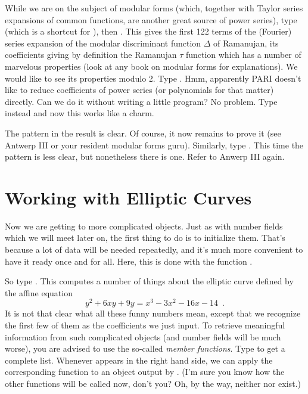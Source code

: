 While we are on the subject of modular forms (which, together with Taylor
series expansions of common functions, are another great source of power
series), type  (which is a shortcut for
), then . This
gives the first 122 terms of the (Fourier) series expansion of the modular
discriminant function $\Delta$ of Ramanujan, its coefficients giving by
definition the Ramanujan $\tau$ function which has a number of marvelous
properties (look at any book on modular forms for explanations). We would like
to see its properties modulo 2. Type . Hmm, apparently PARI
doesn't like to
reduce coefficients of power series (or polynomials for that matter) directly.
Can we do it without writing a little program? No problem. Type instead
 and now this works like a charm.

The pattern in the result is clear. Of course, it now remains to prove it
(see Antwerp III or your resident modular forms guru). Similarly, type
. This time the pattern is less clear, but
nonetheless there is one. Refer to Anwerp III again.

\section{Working with Elliptic Curves}

Now we are getting to more complicated objects. Just as with number fields
which we will meet later on, the first thing to do is to initialize them.
That's because a lot of data will be needed repeatedly, and it's much more
convenient to have it ready once and for all. Here, this is done with the
function .

So type . This computes a number of things
about the elliptic curve defined by the affine equation
%
$$ y^2+6xy+9y = x^3-3x^2-16x-14\enspace. $$
%
It is not that clear what all these funny numbers mean, except that we
recognize the first few of them as the coefficients we just input. To
retrieve meaningful information from such complicated objects (and number
fields will be much worse), you are advised to use the so-called \emph{member
functions}. Type  to get a complete list. Whenever  appears
in the right hand side, we can apply the corresponding function to an object
output by . (I'm sure you know how the other  functions
will be called now, don't you? Oh, by the way, neither  nor
 exist.)


